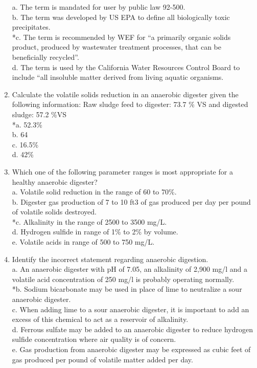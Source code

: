 \documentclass{article}
\begin{document}
\begin{enumerate}
a. The term is mandated for user by public law 92-500. \\
b. The term was developed by US EPA to define all biologically toxic precipitates. \\
*c. The term is recommended by WEF for “a primarily organic solids product, produced by wastewater treatment processes, that can be beneficially recycled”. \\
d. The term is used by the California Water Resources Control Board to include “all insoluble matter derived from living aquatic organisms. \\

\item  Calculate the volatile solids reduction in an anaerobic digester given the following information:  Raw sludge feed to digester:  73.7 \% VS and digested sludge: 57.2 \%VS \\

*a. 52.3\% \\
b. 64 \\
c. 16.5\% \\
d. 42\% \\

\item  Which one of the following parameter ranges is most appropriate for a healthy anaerobic digester? \\

a. Volatile solid reduction in the range of 60 to 70\%. \\
b. Digester gas production of 7 to 10 ft3 of gas produced per day per pound of volatile solids destroyed. \\
*c. Alkalinity in the range of 2500 to 3500 mg/L. \\
d. Hydrogen sulfide in range of 1\% to 2\% by volume. \\
e. Volatile acids in range of 500 to 750 mg/L. \\

\item  Identify the incorrect statement regarding anaerobic digestion. \\

a. An anaerobic digester with pH of 7.05, an alkalinity of 2,900 mg/l and a volatile acid concentration of 250 mg/l is probably operating normally. \\
*b. Sodium bicarbonate may be used in place of lime to neutralize a sour anaerobic digester. \\
c. When adding lime to a sour anaerobic digester, it is important to add an excess of this chemical to act as a reservoir of alkalinity. \\
d. Ferrous sulfate may be added to an anaerobic digester to reduce hydrogen sulfide concentration where air quality is of concern. \\
e. Gas production from anaerobic digester may be expressed as cubic feet of gas produced per pound of volatile matter added per day. \\


\end{enumerate}
\end{document}
